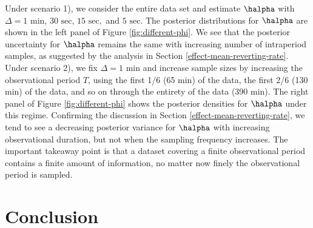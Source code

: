 Under scenario 1), we consider the entire data set and estimate $\halpha$ with $\Delta = 1 \mbox{ min}$, $30 \mbox{ sec}$, $15 \mbox{ sec},$ and $5 \mbox{ sec}$. The posterior distributions for $\halpha$ are shown in the left panel of Figure \ref{fig:different-phi}. We see that the posterior uncertainty for $\halpha$ remains the same with increasing number of intraperiod samples, as suggested by the analysis in Section \ref{effect-mean-reverting-rate}. Under scenario 2), we fix $\Delta = 1 \mbox{ min}$ and increase sample sizes by increasing the observational period $T$, using the first 1/6 (65 min) of the data, the first 2/6 (130 min) of the data, and so on through the entirety of the data (390 min). The right panel of Figure \ref{fig:different-phi} shows the posterior densities for $\halpha$ under this regime. Confirming the discussion in Section \ref{effect-mean-reverting-rate}, we tend to see a decreasing posterior variance for $\halpha$ with increasing observational duration, but not when the sampling frequency increases.  The important takeaway point is that a dataset covering a finite observational period contains a finite amount of information, no matter now finely the observational period is sampled.


\section{Conclusion}

